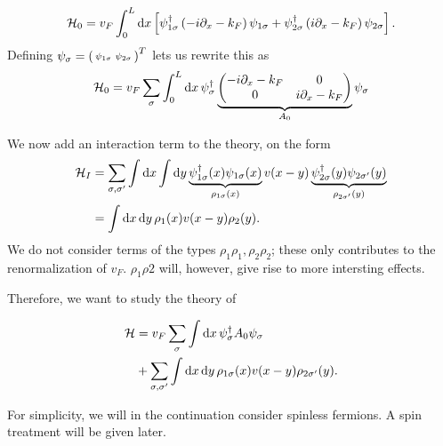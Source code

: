 \begin{equation}
\mathcal{H}_0 = v_F\int_{0}^{L}\dd x\left[\psi_{1\sigma}^\dagger\left(-i\partial_x -k_F\right)\psi_{1\sigma} + \psi_{2\sigma}^\dagger\left(i\partial_x - k_F\right)\psi_{2\sigma}\right].
\end{equation}
Defining $\psi_\sigma = \begin{psmallmatrix*} \psi_{1\sigma} & \psi_{2\sigma}
\end{psmallmatrix*}^T$ lets us rewrite this as
\begin{equation}
\label{eq:imp_def_a0}
\mathcal{H}_0 = v_F\sum_\sigma\int_{0}^{L}\dd x\,\psi_\sigma^\dagger
\underbrace{\begin{pmatrix}
-i\partial_x - k_F & 0 \\
0 &  i\partial_x - k_F 
\end{pmatrix}}_{A_0}\psi_\sigma
\end{equation}

We now add an interaction term to the theory, on the form
\begin{align*}
\mathcal{H}_I &= \sum_{\sigma,\sigma'}\int\dd x\int\dd y\underbrace{\psi_{1\sigma}^\dagger(x)\psi_{1\sigma}(x)}_{\rho_{1\sigma}(x)}v(x-y)\underbrace{\psi_{2\sigma}^\dagger(y)\psi_{2\sigma'}(y)}_{\rho_{2\sigma'}(y)} \\
&= \int \dd{x}\dd{y} \rho_1(x)v(x-y)\rho_2(y).
\end{align*}
We do not consider terms of the types $\rho_1\rho_1, \rho_2\rho_2$; these only contributes to the renormalization of $v_F$. $\rho_1\rho2$ will, however, give rise to more intersting effects.

Therefore, we want to study the theory of

\begin{align}
\begin{split}
\mathcal{H} &= v_F \sum_\sigma \int\dd{x}\psi_\sigma^\dagger A_0\psi_\sigma \\
&+ \sum_{\sigma,\sigma'}\int \dd{x}\dd{y} \rho_{1\sigma}(x)v(x-y)\rho_{2\sigma'}(y).
\end{split}
\end{align}

For simplicity, we will in the continuation consider spinless fermions. A spin treatment will be given later. 


